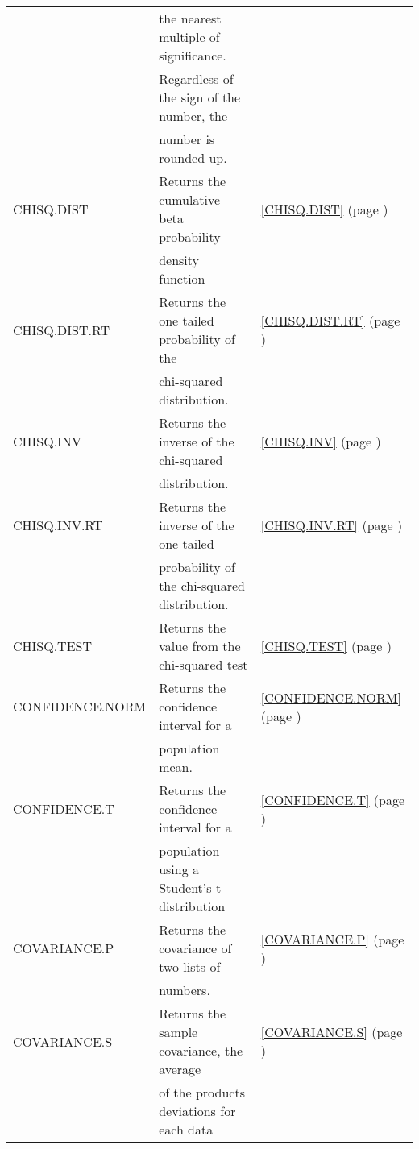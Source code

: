 \begin{center}
\begin{longtable}{l l l }
		& the nearest multiple of significance. &   \\
		& Regardless of the sign of the number, the  &   \\
		& number is rounded up. &   \\
		CHISQ.DIST & Returns the cumulative beta probability &  \ref{CHISQ.DIST} (page \pageref{CHISQ.DIST}) \index{Spreadsheet Functions!CHISQ.DIST} \\
		& density function &   \\
		CHISQ.DIST.RT & Returns the one tailed probability of the  &  \ref{CHISQ.DIST.RT} (page \pageref{CHISQ.DIST.RT}) \index{Spreadsheet Functions!CHISQ.DIST.RT} \\
		& chi-squared distribution. &   \\
		CHISQ.INV & Returns the inverse of the chi-squared  &  \ref{CHISQ.INV} (page \pageref{CHISQ.INV}) \index{Spreadsheet Functions!CHISQ.INV} \\
		& distribution. &   \\
		CHISQ.INV.RT & Returns the inverse of the one tailed &  \ref{CHISQ.INV.RT} (page \pageref{CHISQ.INV.RT}) \index{Spreadsheet Functions!CHISQ.INV.RT} \\
		& probability of the chi-squared distribution. &   \\
		CHISQ.TEST & Returns the value from the chi-squared test &  \ref{CHISQ.TEST} (page \pageref{CHISQ.TEST}) \index{Spreadsheet Functions!CHISQ.TEST} \\
		CONFIDENCE.NORM & Returns the confidence interval for a &  \ref{CONFIDENCE.NORM} (page \pageref{CONFIDENCE.NORM}) \index{Spreadsheet Functions!CONFIDENCE.NORM} \\
		& population mean. &   \\
		CONFIDENCE.T & Returns the confidence interval for a &  \ref{CONFIDENCE.T} (page \pageref{CONFIDENCE.T}) \index{Spreadsheet Functions!CONFIDENCE.T } \\
		& population using a Student's t distribution &   \\
		COVARIANCE.P & Returns the covariance of two lists of  &  \ref{COVARIANCE.P} (page \pageref{COVARIANCE.P}) \index{Spreadsheet Functions!COVARIANCE.P} \\
		& numbers. &   \\
		COVARIANCE.S & Returns the sample covariance, the average &  \ref{COVARIANCE.S} (page \pageref{COVARIANCE.S}) \index{Spreadsheet Functions!COVARIANCE.S} \\
		& of the products deviations for each data &   \\

\end{longtable}
\end{center}
